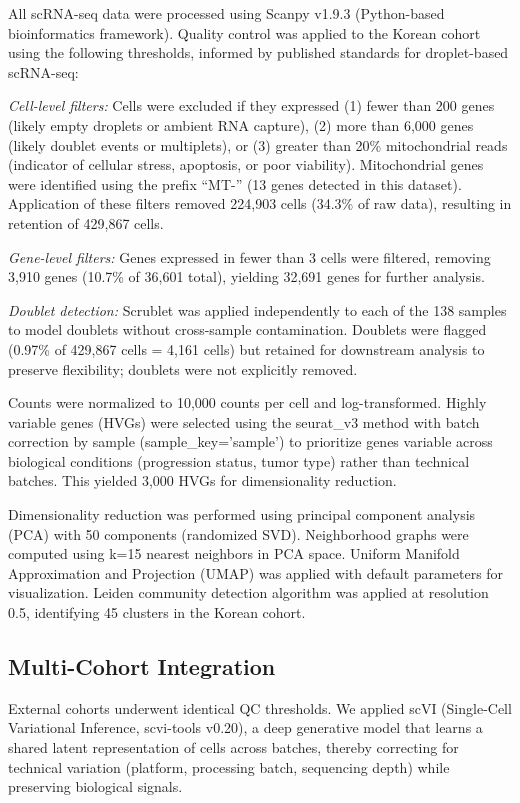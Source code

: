 \documentclass[12pt,twoside]{article}
\begin{document}
All scRNA-seq data were processed using Scanpy v1.9.3 (Python-based bioinformatics framework). Quality control was applied to the Korean cohort using the following thresholds, informed by published standards for droplet-based scRNA-seq:

\textit{Cell-level filters:} Cells were excluded if they expressed (1) fewer than 200 genes (likely empty droplets or ambient RNA capture), (2) more than 6,000 genes (likely doublet events or multiplets), or (3) greater than 20\% mitochondrial reads (indicator of cellular stress, apoptosis, or poor viability). Mitochondrial genes were identified using the prefix ``MT-'' (13 genes detected in this dataset). Application of these filters removed 224,903 cells (34.3\% of raw data), resulting in retention of 429,867 cells.

\textit{Gene-level filters:} Genes expressed in fewer than 3 cells were filtered, removing 3,910 genes (10.7\% of 36,601 total), yielding 32,691 genes for further analysis.

\textit{Doublet detection:} Scrublet was applied independently to each of the 138 samples to model doublets without cross-sample contamination. Doublets were flagged (0.97\% of 429,867 cells = 4,161 cells) but retained for downstream analysis to preserve flexibility; doublets were not explicitly removed.

Counts were normalized to 10,000 counts per cell and log-transformed. Highly variable genes (HVGs) were selected using the seurat\_v3 method with batch correction by sample (sample\_key='sample') to prioritize genes variable across biological conditions (progression status, tumor type) rather than technical batches. This yielded 3,000 HVGs for dimensionality reduction.

Dimensionality reduction was performed using principal component analysis (PCA) with 50 components (randomized SVD). Neighborhood graphs were computed using k=15 nearest neighbors in PCA space. Uniform Manifold Approximation and Projection (UMAP) was applied with default parameters for visualization. Leiden community detection algorithm was applied at resolution 0.5, identifying 45 clusters in the Korean cohort.

\subsection{Multi-Cohort Integration}

External cohorts underwent identical QC thresholds. We applied scVI (Single-Cell Variational Inference, scvi-tools v0.20), a deep generative model that learns a shared latent representation of cells across batches, thereby correcting for technical variation (platform, processing batch, sequencing depth) while preserving biological signals.
\end{document}
